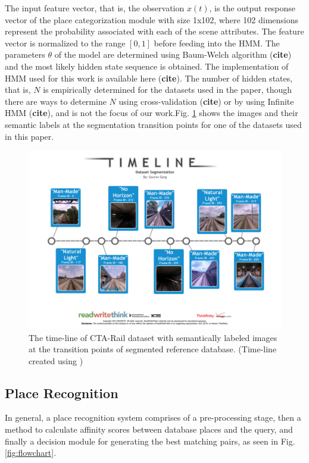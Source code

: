 \documentclass[letterpaper, 10 pt, conference]{ieeeconf}  %
\begin{document}
The input feature vector, that is, the observation $x(t)$, is the output response vector of the place categorization module with size 1x102, where 102 dimensions represent the probability associated with each of the scene attributes. The feature vector is normalized to the range $[0,1]$ before feeding into the HMM. The parameters $\theta$ of the model are determined using Baum-Welch algorithm (\textbf{cite}) and the most likely hidden state sequence is obtained. The implementation of HMM used for this work is available here (\textbf{cite}). The number of hidden states, that is, $N$ is empirically determined for the datasets used in the paper, though there are ways to determine $N$ using cross-validation (\textbf{cite}) or by using Infinite HMM (\textbf{cite}), and is not the focus of our work.Fig. \ref{fig:datasetLabels} shows the images and their semantic labels at the segmentation transition points for one of the datasets used in this paper.

\begin{figure}
 \includegraphics[clip, trim=2cm 4cm 2cm 4cm,scale=0.32]{cta-dataset-segmentation-1}
 \caption{The time-line of CTA-Rail dataset with semantically labeled images at the transition points of segmented reference database. (Time-line created using \cite{timelineRWT})}
 \label{fig:datasetLabels}
\end{figure}

\subsection{Place Recognition}
In general, a place recognition system comprises of a pre-processing stage, then a method to calculate affinity scores between database places and the query, and finally a decision module for generating the best matching pairs, as seen in Fig. \ref{fig:flowchart}.
\end{document}
